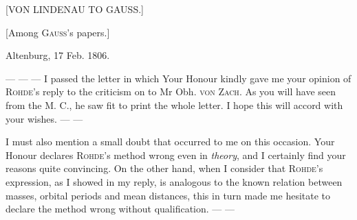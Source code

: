 \clearpage
\hypertarget{native-491-lindenau}{}
\label{native-491-lindenau}
\begin{center}
[VON LINDENAU TO GAUSS.]

[Among \textsc{Gauss}’s papers.]
\end{center}

\begin{flushright}Altenburg, 17 Feb. 1806.\end{flushright}

--- --- --- I passed the letter in which Your Honour kindly gave me your opinion of \textsc{Rohde}’s reply to the criticism on to Mr Obh. \textsc{von Zach}. As you will have seen from the M. C., he saw fit to print the whole letter. I hope this will accord with your wishes. --- ---

I must also mention a small doubt that occurred to me on this occasion. Your Honour declares \textsc{Rohde}’s method wrong even in \emph{theory}, and I certainly find your reasons quite convincing. On the other hand, when I consider that \textsc{Rohde}’s expression, as I showed in my reply, is analogous to the known relation between masses, orbital periods and mean distances, this in turn made me hesitate to declare the method wrong without qualification. --- ---

